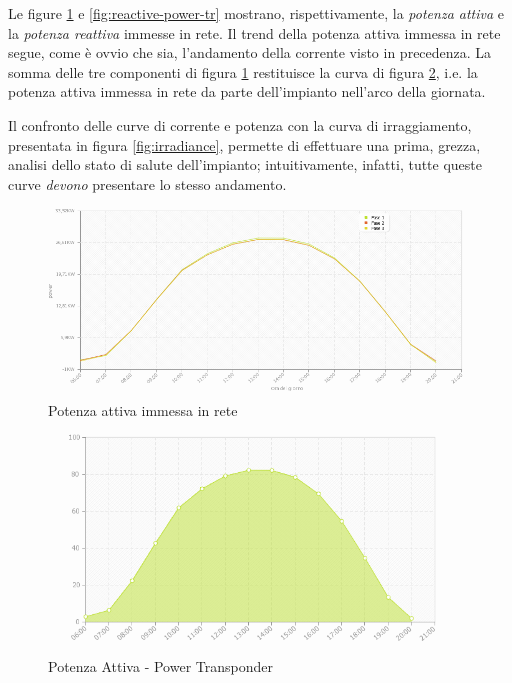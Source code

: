 %
Le figure \ref{fig:active-power-tr} e \ref{fig:reactive-power-tr} mostrano, rispettivamente, 
la \emph{potenza attiva} e la \emph{potenza reattiva} immesse in rete.
%
Il trend della potenza attiva immessa in rete segue, come \`e ovvio che sia, l'andamento della 
corrente visto in precedenza. 
%
La somma delle tre componenti di figura \ref{fig:active-power-tr} restituisce la curva di figura 
\ref{fig:total-active-power-tr}, i.e. la potenza attiva immessa in rete da parte dell'impianto
nell'arco della giornata.
%

%
Il confronto delle curve di corrente e potenza con la curva di irraggiamento, presentata in figura 
\ref{fig:irradiance}, permette di effettuare una prima, grezza, analisi dello stato di salute 
dell'impianto; intuitivamente, infatti, tutte queste curve \emph{devono} presentare lo stesso 
andamento.
%

%
\begin{figure}[!h]
\centering
\includegraphics[width=400pt]{img/portale/active-power-transponder.png}
\caption{Potenza attiva immessa in rete}
\label{fig:active-power-tr}
\end{figure}
%

%
\begin{figure}[!h]
\centering
\includegraphics[width=400pt]{img/portale/potenza-giornaliera.png}
\caption{Potenza Attiva - Power Transponder}
\label{fig:total-active-power-tr}
\end{figure}
%

